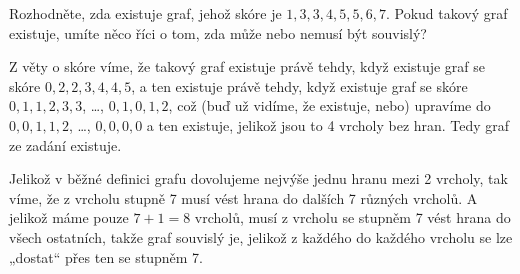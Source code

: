 \documentclass[12pt]{article}					%
\begin{document}
\begin{priklad}[1]
    Rozhodněte, zda existuje graf, jehož skóre je $1, 3, 3, 4, 5, 5, 6, 7$. Pokud takový graf existuje, umíte něco říci o tom, zda může nebo nemusí být souvislý?

    \begin{reseni}[Existence]
        Z věty o skóre víme, že takový graf existuje právě tehdy, když existuje graf se skóre $0, 2, 2, 3, 4, 4, 5$, a ten existuje právě tehdy, když existuje graf se skóre $0, 1, 1, 2, 3, 3$, …, $0, 1, 0, 1, 2$, což (buď už vidíme, že existuje, nebo) upravíme do $0, 0, 1, 1, 2$, …, $0, 0, 0, 0$ a ten existuje, jelikož jsou to 4 vrcholy bez hran. Tedy graf ze zadání existuje.
    \end{reseni}

    \begin{reseni}[Souvislost]
        Jelikož v běžné definici grafu dovolujeme nejvýše jednu hranu mezi 2 vrcholy, tak víme, že z vrcholu stupně 7 musí vést hrana do dalších 7 různých vrcholů. A jelikož máme pouze $7+1 = 8$ vrcholů, musí z vrcholu se stupněm 7 vést hrana do všech ostatních, takže graf souvislý je, jelikož z každého do každého vrcholu se lze „dostat“ přes ten se stupněm 7.
    \end{reseni}
\end{priklad}

\pagebreak
\end{document}
